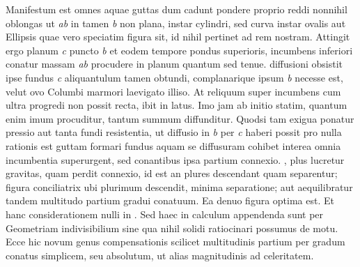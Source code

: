 \pstart Manifestum est omnes aquae guttas dum cadunt pondere proprio reddi nonnihil oblongas ut \textit{ab} in  tamen \textit{b} non plana, instar cylindri, sed curva instar ovalis aut Ellipsis quae vero speciatim figura sit, id nihil pertinet ad rem nostram. Attingit ergo planum \textit{c} puncto \textit{b} et eodem tempore pondus superioris, incumbens inferiori conatur massam \textit{ab} procudere in planum quantum  sed tenue.  diffusioni obsistit ipse fundus \textit{c} aliquantulum tamen obtundi, complanarique ipsum \textit{b} necesse est, velut ovo Columbi\protect{} marmori laevigato illiso. At reliquum super incumbens cum ultra progredi non possit recta, ibit in latus. Imo jam ab initio statim, quantum enim imum procuditur, tantum summum diffunditur. Quodsi tam exigua ponatur pressio aut tanta fundi resistentia, ut diffusio in \textit{b} per \textit{c} haberi possit pro nulla  rationis est guttam formari  fundus aquam se diffusuram cohibet interea omnia incumbentia superurgent, sed  conantibus ipsa partium connexio. , plus lucretur gravitas\protect{}, quam perdit connexio, id est an plures descendant quam separentur; figura conciliatrix ubi plurimum descendit, minima separatione; aut aequilibratur tandem multitudo partium gradui conatuum. Ea denuo figura optima est. Et hanc considerationem nulli in . Sed haec in calculum appendenda sunt per Geometriam indivisibilium sine qua nihil solidi ratiocinari possumus de motu. Ecce hic novum genus compensationis scilicet multitudinis partium per gradum conatus\protect{} simplicem, seu absolutum, ut alias magnitudinis ad celeritatem.

